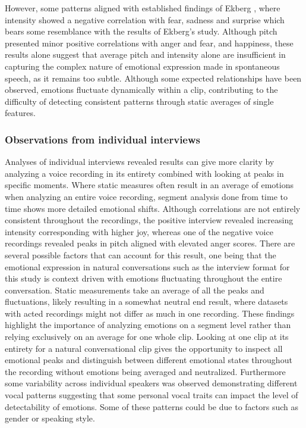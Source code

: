 However, some patterns aligned with established findings of Ekberg \autocite{Ekberg2023}, where intensity showed a negative correlation with fear, sadness and surprise which bears some resemblance with the results of Ekberg’s study. Although pitch presented minor positive correlations with anger and fear, and happiness, these results alone suggest that average pitch and intensity alone are insufficient in capturing the complex nature of emotional expression made in spontaneous speech, as it remains too subtle. Although some expected relationships have been observed, emotions fluctuate dynamically within a clip, contributing to the difficulty of detecting consistent patterns through static averages of single features.

\subsubsection{Observations from individual interviews}
Analyses of individual interviews revealed results can give more clarity by analyzing a voice recording in its entirety combined with looking at peaks in specific moments. Where static measures often result in an average of emotions when analyzing an entire voice recording, segment analysis done from time to time shows more detailed emotional shifts. Although correlations are not entirely consistent throughout the recordings, the positive interview revealed increasing intensity corresponding with higher joy, whereas one of the negative voice recordings revealed peaks in pitch aligned with elevated anger scores. 
There are several possible factors that can account for this result, one being that the emotional expression in natural conversations such as the interview format for this study is context driven with emotions fluctuating throughout the entire conversation. Static measurements take an average of all the peaks and fluctuations, likely resulting in a somewhat neutral end result, where datasets with acted recordings might not differ as much in one recording.
These findings highlight the importance of analyzing emotions on a segment level rather than relying exclusively on an average for one whole clip. Looking at one clip at its entirety for a natural conversational clip gives the opportunity to inspect all emotional peaks and distinguish between different emotional states throughout the recording without emotions being averaged and neutralized.
Furthermore some variability across individual speakers was observed demonstrating different vocal patterns suggesting that some personal vocal traits can impact the level of detectability of emotions. Some of these patterns could be due to factors such as gender or speaking style.

